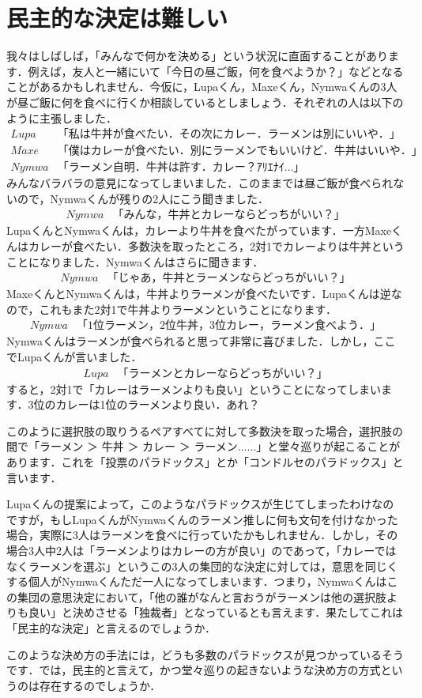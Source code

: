 \section{民主的な決定は難しい}
我々はしばしば，「みんなで何かを決める」という状況に直面することがあります．例えば，友人と一緒にいて「今日の昼ご飯，何を食べようか？」などとなることがあるかもしれません．今仮に，Lupaくん，Maxeくん，Nymwaくんの3人が昼ご飯に何を食べに行くか相談しているとしましょう．それぞれの人は以下のように主張しました．
\begin{align*}
    Lupa　&「私は牛丼が食べたい．その次にカレー．ラーメンは別にいいや．」\\
    Maxe　&「僕はカレーが食べたい．別にラーメンでもいいけど．牛丼はいいや．」\\
    Nymwa　&「ラーメン自明．牛丼は許す．カレー？ｱﾘｴﾅｲ…」
\end{align*}
みんなバラバラの意見になってしまいました．このままでは昼ご飯が食べられないので，Nymwaくんが残りの2人にこう聞きました．
\begin{align*}
    Nymwa　&「みんな，牛丼とカレーならどっちがいい？」
\end{align*}
LupaくんとNymwaくんは，カレーより牛丼を食べたがっています．一方Maxeくんはカレーが食べたい．多数決を取ったところ，2対1でカレーよりは牛丼ということになりました．Nymwaくんはさらに聞きます．
\begin{align*}
    Nymwa　&「じゃあ，牛丼とラーメンならどっちがいい？」
\end{align*}
MaxeくんとNymwaくんは，牛丼よりラーメンが食べたいです．Lupaくんは逆なので，これもまた2対1で牛丼よりラーメンということになります．
\begin{align*}
    Nymwa　&「1位ラーメン，2位牛丼，3位カレー，ラーメン食べよう．」
\end{align*}
Nymwaくんはラーメンが食べられると思って非常に喜びました．しかし，ここでLupaくんが言いました．
\begin{align*}
    Lupa　&「ラーメンとカレーならどっちがいい？」
\end{align*}
すると，2対1で「カレーはラーメンよりも良い」ということになってしまいます．3位のカレーは1位のラーメンより良い．あれ？

このように選択肢の取りうるペアすべてに対して多数決を取った場合，選択肢の間で「ラーメン ＞ 牛丼 ＞ カレー ＞ ラーメン$\dots\dots$」と堂々巡りが起こることがあります．これを「投票のパラドックス」とか「コンドルセのパラドックス」と言います．

Lupaくんの提案によって，このようなパラドックスが生じてしまったわけなのですが，もしLupaくんがNymwaくんのラーメン推しに何も文句を付けなかった場合，実際に3人はラーメンを食べに行っていたかもしれません．しかし，その場合3人中2人は「ラーメンよりはカレーの方が良い」のであって，「カレーではなくラーメンを選ぶ」というこの3人の集団的な決定に対しては，意思を同じくする個人がNymwaくんただ一人になってしまいます．つまり，Nymwaくんはこの集団の意思決定において，「他の誰がなんと言おうがラーメンは他の選択肢よりも良い」と決めさせる「独裁者」となっているとも言えます．果たしてこれは「民主的な決定」と言えるのでしょうか．

このような決め方の手法には，どうも多数のパラドックスが見つかっているそうです．では，民主的と言えて，かつ堂々巡りの起きないような決め方の方式というのは存在するのでしょうか．

